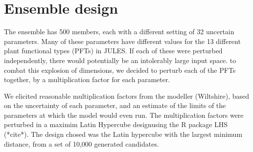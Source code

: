 \documentclass[gmd, manuscript]{copernicus}
\begin{document}








\appendix

\section{Ensemble design}
The ensemble has 500 members, each with a different setting of 32 uncertain parameters. Many of these parameters have different values for the 13 different plant functional types (PFTs) in JULES. If each of these were perturbed independently, there would potentially be an intolerably large input space. to combat this explosion of dimensions, we decided to perturb each of the PFTs together, by a multiplication factor for each parameter. 

We elicited reasonable multiplication factors from the modeller (Wiltshire), based on the uncertainty of each parameter, and an estimate of the limits of the parameters at which the model would even run. The multiplication factors were perturbed in a maximim Latin Hypercube designusing the R package LHS (*cite*). The design chosed was the Latin hypercube with the largest minimum distance, from a set of 10,000 generated candidates.
\end{document}
